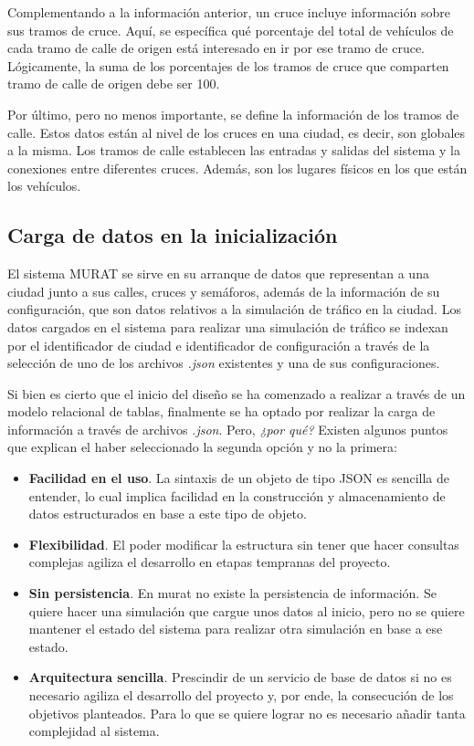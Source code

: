 Complementando a la información anterior, un cruce incluye información sobre sus tramos de cruce. Aquí, se específica qué porcentaje del total de vehículos de cada tramo de calle de origen está interesado en ir por ese tramo de cruce. Lógicamente, la suma de los porcentajes de los tramos de cruce que comparten tramo de calle de origen debe ser 100.


Por último, pero no menos importante, se define la información de los tramos de calle. Estos datos están al nivel de los cruces en una ciudad, es decir, son globales a la misma. Los tramos de calle establecen las entradas y salidas del sistema y la conexiones entre diferentes cruces. Además, son los lugares físicos en los que están los vehículos.


\subsection{Carga de datos en la inicialización}
El sistema MURAT se sirve en su arranque de datos que representan a una ciudad junto a sus calles, cruces y semáforos, además de la información de su configuración, que son datos relativos a la simulación de tráfico en la ciudad. Los datos cargados en el sistema para realizar una simulación de tráfico se indexan por el identificador de ciudad e identificador de configuración a través de la selección de uno de los archivos \textit{.json} existentes y una de sus configuraciones.

Si bien es cierto que el inicio del diseño se ha comenzado a realizar a través de un modelo relacional de tablas, finalmente se  ha optado por realizar la carga de información a través de archivos \textit{.json}. Pero, \textit{¿por qué?} Existen algunos puntos que explican el haber seleccionado la segunda opción y no la primera:
\begin{itemize}
    \item \textbf{Facilidad en el uso}. La sintaxis de un objeto de tipo JSON es sencilla de entender, lo cual implica facilidad en la construcción y almacenamiento de datos estructurados en base a este tipo de objeto.
    \item \textbf{Flexibilidad}. El poder modificar la estructura sin tener que hacer consultas complejas agiliza el desarrollo en etapas tempranas del proyecto.
    \item \textbf{Sin persistencia}. En \acrshort{murat} no existe la persistencia de información. Se quiere hacer una simulación que cargue unos datos al inicio, pero no se quiere mantener el estado del sistema para realizar otra simulación en base a ese estado.
    \item \textbf{Arquitectura sencilla}. Prescindir de un servicio de base de datos si no es necesario agiliza el desarrollo del proyecto y, por ende, la consecución de los objetivos planteados. Para lo que se quiere lograr no es necesario añadir tanta complejidad al sistema. 
\end{itemize}